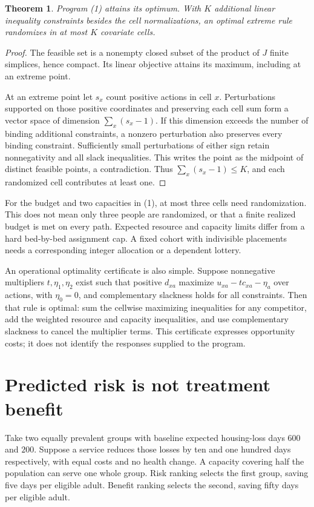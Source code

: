 \documentclass[11pt,a4paper]{article}
\newtheorem{theorem}{Theorem}[section]
\begin{document}
\begin{theorem}
Program (1) attains its optimum. With $K$ additional linear inequality constraints besides the cell normalizations, an optimal extreme rule randomizes in at most $K$ covariate cells.
\end{theorem}
\begin{proof}
The feasible set is a nonempty closed subset of the product of $J$ finite simplices, hence compact. Its linear objective attains its maximum, including at an extreme point.

At an extreme point let $s_x$ count positive actions in cell $x$. Perturbations supported on those positive coordinates and preserving each cell sum form a vector space of dimension $\sum_x(s_x-1)$. If this dimension exceeds the number of binding additional constraints, a nonzero perturbation also preserves every binding constraint. Sufficiently small perturbations of either sign retain nonnegativity and all slack inequalities. This writes the point as the midpoint of distinct feasible points, a contradiction. Thus $\sum_x(s_x-1)\le K$, and each randomized cell contributes at least one.
\end{proof}
For the budget and two capacities in (1), at most three cells need randomization. This does not mean only three people are randomized, or that a finite realized budget is met on every path. Expected resource and capacity limits differ from a hard bed-by-bed assignment cap. A fixed cohort with indivisible placements needs a corresponding integer allocation or a dependent lottery.

An operational optimality certificate is also simple. Suppose nonnegative multipliers $t,\eta_1,\eta_2$ exist such that positive $d_{xa}$ maximize
$u_{xa}-tc_{xa}-\eta_a$ over actions, with $\eta_0=0$, and complementary slackness holds for all constraints. Then that rule is optimal: sum the cellwise maximizing inequalities for any competitor, add the weighted resource and capacity inequalities, and use complementary slackness to cancel the multiplier terms. This certificate expresses opportunity costs; it does not identify the responses supplied to the program.
\section{Predicted risk is not treatment benefit}
Take two equally prevalent groups with baseline expected housing-loss days $600$ and $200$. Suppose a service reduces those losses by ten and one hundred days respectively, with equal costs and no health change. A capacity covering half the population can serve one whole group. Risk ranking selects the first group, saving five days per eligible adult. Benefit ranking selects the second, saving fifty days per eligible adult.
\end{document}
